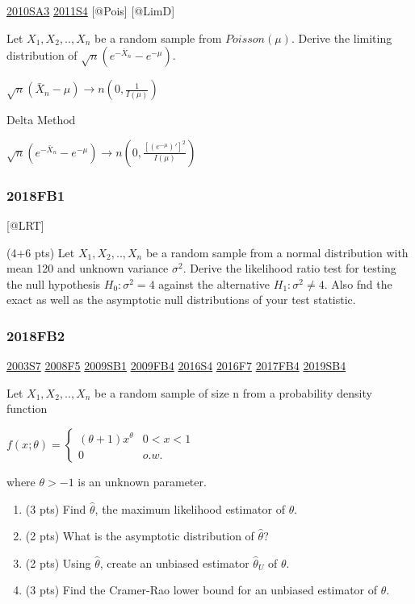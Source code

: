 \documentclass[6pt,twocolumn,Portrait]{article}
\begin{document}
\protect\hyperlink{sa3-1}{2010SA3} \protect\hyperlink{s4-2}{2011S4}
{[}@Pois{]} {[}@LimD{]}

Let \(X_1,X_2,..,X_n\) be a random sample from \(Poisson(\mu)\). Derive
the limiting distribution of \(\sqrt{n}(e^{-\bar X_n}-e^{-\mu})\).

\(\sqrt{n}(\bar X_n-\mu)\to n(0,\frac1{I(\mu)})\)

Delta Method

\(\sqrt{n}(e^{-\bar X_n}-e^{-\mu})\to n(0,\frac{[(e^{-\mu})']^2}{I(\mu)})\)

\hypertarget{fb1-4}{%
\subsubsection{2018FB1}\label{fb1-4}}

{[}@LRT{]}

(4+6 pts) Let \(X_1,X_2,..,X_n\) be a random sample from a normal
distribution with mean 120 and unknown variance \(\sigma^2\). Derive the
likelihood ratio test for testing the null hypothesis \(H_0:\sigma^2=4\)
against the alternative \(H_1:\sigma^2\neq4\). Also fnd the exact as
well as the asymptotic null distributions of your test statistic.

\hypertarget{fb2-4}{%
\subsubsection{2018FB2}\label{fb2-4}}

\protect\hyperlink{s7}{2003S7} \protect\hyperlink{f5-3}{2008F5}
\protect\hyperlink{sb1}{2009SB1} \protect\hyperlink{fb4}{2009FB4}
\protect\hyperlink{s4-4}{2016S4} \protect\hyperlink{f7-5}{2016F7}
\protect\hyperlink{fb4-3}{2017FB4} \protect\hyperlink{sb4-2}{2019SB4}

Let \(X_1,X_2,..,X_n\) be a random sample of size n from a probability
density function

\(f(x;\theta)=\begin{cases}(\theta+1)x^\theta& 0<x<1\\0& o.w.\end{cases}\)

where \(\theta>-1\) is an unknown parameter.

\begin{enumerate}
\def\labelenumi{(\alph{enumi})}
\item
  (3 pts) Find \(\hat\theta\), the maximum likelihood estimator of
  \(\theta\).
\item
  (2 pts) What is the asymptotic distribution of \(\hat\theta\)?
\item
  (2 pts) Using \(\hat\theta\), create an unbiased estimator
  \(\hat\theta_U\) of \(\theta\).
\item
  (3 pts) Find the Cramer-Rao lower bound for an unbiased estimator of
  \(\theta\).
\end{enumerate}
\end{document}
